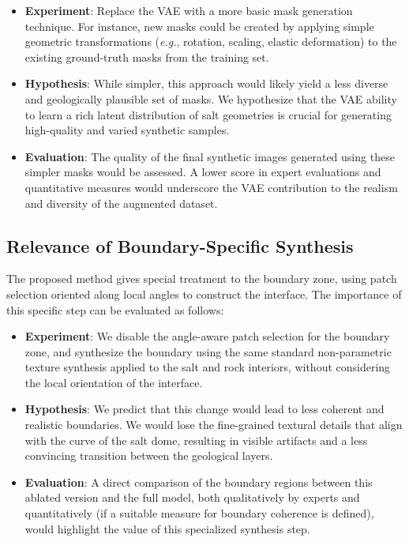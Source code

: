 \documentclass{ieeeaccess}
\begin{document}
\begin{itemize}
    \item \textbf{Experiment}: Replace the VAE with a more basic mask generation technique. For instance, new masks could be created by applying simple geometric transformations (\emph{e.g.}, rotation, scaling, elastic deformation) to the existing ground-truth masks from the training set.
    \item \textbf{Hypothesis}: While simpler, this approach would likely yield a less diverse and geologically plausible set of masks. We hypothesize that the VAE ability to learn a rich latent distribution of salt geometries is crucial for generating high-quality and varied synthetic samples.
    \item \textbf{Evaluation}: The quality of the final synthetic images generated using these simpler masks would be assessed. A lower score in expert evaluations and quantitative measures would underscore the VAE contribution to the realism and diversity of the augmented dataset.
\end{itemize}

\subsection{Relevance of Boundary-Specific Synthesis}

The proposed method gives special treatment to the boundary zone, using patch selection oriented along local angles to construct the interface. The importance of this specific step can be evaluated as follows:

\begin{itemize}
    \item \textbf{Experiment}: We disable the angle-aware patch selection for the boundary zone, and synthesize the boundary using the same standard non-parametric texture synthesis applied to the salt and rock interiors, without considering the local orientation of the interface.
    \item \textbf{Hypothesis}: We predict that this change would lead to less coherent and realistic boundaries. We would lose the fine-grained textural details that align with the curve of the salt dome, resulting in visible artifacts and a less convincing transition between the geological layers.
    \item \textbf{Evaluation}: A direct comparison of the boundary regions between this ablated version and the full model, both qualitatively by experts and quantitatively (if a suitable measure for boundary coherence is defined), would highlight the value of this specialized synthesis step.
\end{itemize}
\end{document}
